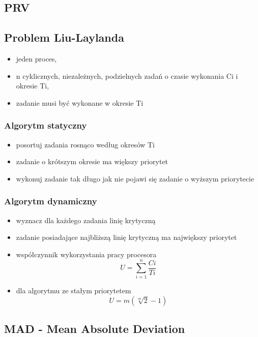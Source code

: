 \documentclass[12pt,a4paper]{article}
\begin{document}
\subsection{PRV}
\subsection{Problem Liu-Laylanda}
\begin{itemize}
\item jeden proces,
\item n cyklicznych, niezależnych, podzielnych zadań o czasie wykonania Ci i okresie Ti,
\item zadanie musi być wykonane w okresie Ti
\end{itemize}
\subsubsection{Algorytm statyczny}
\begin{itemize}
\item posortuj zadania rosnąco według okresów Ti
\item zadanie o krótszym okresie ma większy priorytet
\item wykonuj zadanie tak długo jak nie pojawi się zadanie o wyższym priorytecie
\end{itemize}
\subsubsection{Algorytm dynamiczny}
\begin{itemize}
\item wyznacz dla każdego zadania linię krytyczną
\item zadanie posiadające najbliższą linię krytyczną ma największy priorytet
\item współczynnik wykorzystania pracy procesora
\begin{equation}
U=\sum\limits_{i=1}^{n}\frac{Ci}{Ti}
\end{equation}
\item dla algorytmu ze stałym priorytetem
\begin{equation}
U=m(\sqrt[m]{2}-1)
\end{equation}
\end{itemize}
\subsection{MAD - Mean Absolute Deviation}
\end{document}
